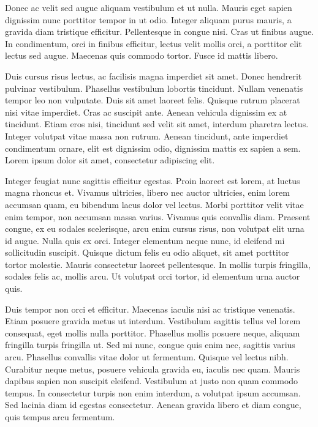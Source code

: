 \documentclass[runningheads,a4paper]{llncs}
\begin{document}
Donec ac velit sed augue aliquam vestibulum et ut nulla. Mauris eget sapien dignissim nunc porttitor tempor in ut odio. Integer aliquam purus mauris, a gravida diam tristique efficitur. Pellentesque in congue nisi. Cras ut finibus augue. In condimentum, orci in finibus efficitur, lectus velit mollis orci, a porttitor elit lectus sed augue. Maecenas quis commodo tortor. Fusce id mattis libero.

Duis cursus risus lectus, ac facilisis magna imperdiet sit amet. Donec hendrerit pulvinar vestibulum. Phasellus vestibulum lobortis tincidunt. Nullam venenatis tempor leo non vulputate. Duis sit amet laoreet felis. Quisque rutrum placerat nisi vitae imperdiet. Cras ac suscipit ante. Aenean vehicula dignissim ex at tincidunt. Etiam eros nisi, tincidunt sed velit sit amet, interdum pharetra lectus. Integer volutpat vitae massa non rutrum. Aenean tincidunt, ante imperdiet condimentum ornare, elit est dignissim odio, dignissim mattis ex sapien a sem. Lorem ipsum dolor sit amet, consectetur adipiscing elit.

Integer feugiat nunc sagittis efficitur egestas. Proin laoreet est lorem, at luctus magna rhoncus et. Vivamus ultricies, libero nec auctor ultricies, enim lorem accumsan quam, eu bibendum lacus dolor vel lectus. Morbi porttitor velit vitae enim tempor, non accumsan massa varius. Vivamus quis convallis diam. Praesent congue, ex eu sodales scelerisque, arcu enim cursus risus, non volutpat elit urna id augue. Nulla quis ex orci. Integer elementum neque nunc, id eleifend mi sollicitudin suscipit. Quisque dictum felis eu odio aliquet, sit amet porttitor tortor molestie. Mauris consectetur laoreet pellentesque. In mollis turpis fringilla, sodales felis ac, mollis arcu. Ut volutpat orci tortor, id elementum urna auctor quis.

Duis tempor non orci et efficitur. Maecenas iaculis nisi ac tristique venenatis. Etiam posuere gravida metus ut interdum. Vestibulum sagittis tellus vel lorem consequat, eget mollis nulla porttitor. Phasellus mollis posuere neque, aliquam fringilla turpis fringilla ut. Sed mi nunc, congue quis enim nec, sagittis varius arcu. Phasellus convallis vitae dolor ut fermentum. Quisque vel lectus nibh. Curabitur neque metus, posuere vehicula gravida eu, iaculis nec quam. Mauris dapibus sapien non suscipit eleifend. Vestibulum at justo non quam commodo tempus. In consectetur turpis non enim interdum, a volutpat ipsum accumsan. Sed lacinia diam id egestas consectetur. Aenean gravida libero et diam congue, quis tempus arcu fermentum.
\end{document}
